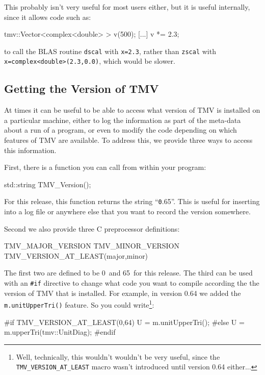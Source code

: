 \documentclass[twoside,letterpaper,11pt]{article}
\newcommand{\tmvversion}{0.65}
\newcommand{\tmvmajorversion}{0}
\newcommand{\tmvminorversion}{65}
\newcommand{\tttmvversion}{\texttt \tmvversion}
\renewcommand{\tt}[1]{{\lstinline {#1}}}
\begin{document}
This probably isn't very useful for most users either, but it is useful internally,
since it allows code such as:
\begin{tmvcode}
tmv::Vector<complex<double> > v(500);
[...]
v *= 2.3;
\end{tmvcode}
to call the BLAS routine \tt{dscal} with \tt{x=2.3}, rather than \tt{zscal}
with \tt{x=complex<double>(2.3,0.0)}, which would be slower.

\subsection{Getting the Version of TMV}

At times it can be useful to be able to access what version of TMV is installed on a 
particular machine, either to log the information as part of the meta-data about a
run of a program, or even to modify the code depending on which features of TMV
are available.  To address this, we provide three ways to access this information.

First, there is a function you can call from within your program:
\begin{tmvcode}
std::string TMV_Version();
\end{tmvcode}
For this release, this function returns the string ``\tttmvversion''.  This is useful for inserting
into a log file or anywhere else that you want to record the version somewhere.

Second we also provide three C preprocessor definitions:
\begin{tmvcode}
TMV_MAJOR_VERSION
TMV_MINOR_VERSION
TMV_VERSION_AT_LEAST(major,minor)
\end{tmvcode}
The first two are defined to be \tmvmajorversion\ and \tmvminorversion\ for this release.
The third can be used with an \tt{#if} directive to change what code you want to compile
according the the version of TMV that is installed.
For example, in version 0.64 we added the \tt{m.unitUpperTri()} feature.  So you could
write\footnote{
Well, technically, this wouldn't wouldn't be very useful, 
since the \tt{TMV_VERSION_AT_LEAST} macro
wasn't introduced until version 0.64 either...}:
\begin{tmvcode}
#if TMV_VERSION_AT_LEAST(0,64)
U = m.unitUpperTri();
#else
U = m.upperTri(tmv::UnitDiag);
#endif
\end{tmvcode}
\end{document}
